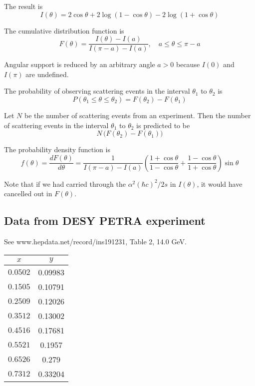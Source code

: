 \documentclass[12pt]{article}
\begin{document}
The result is
\begin{equation*}
I(\theta)=2\cos\theta+2\log(1-\cos\theta)-2\log(1+\cos\theta)
\end{equation*}

The cumulative distribution function is
\begin{equation*}
F(\theta)=\frac{I(\theta)-I(a)}{I(\pi-a)-I(a)},
\quad
a\le\theta\le\pi-a
\end{equation*}

Angular support is reduced by an arbitrary angle $a>0$ because $I(0)$ and $I(\pi)$ are undefined.

\bigskip
The probability of observing scattering events in the interval
$\theta_1$ to $\theta_2$ is
\begin{equation*}
P(\theta_1\le\theta\le\theta_2)=F(\theta_2)-F(\theta_1)
\end{equation*}

Let $N$ be the number of scattering events from an experiment.
Then the number of scattering events in the interval $\theta_1$
to $\theta_2$ is predicted to be
$$
N\,\bigl(F(\theta_2)-F(\theta_1)\bigr)
$$

The probability density function is
$$
f(\theta)=\frac{dF(\theta)}{d\theta}
=\frac{1}{I(\pi-a)-I(a)}
\left(\frac{1+\cos\theta}{1-\cos\theta}+\frac{1-\cos\theta}{1+\cos\theta}\right)
\sin\theta
$$

Note that if we had carried through the $\alpha^2(\hbar c)^2/2s$ in $I(\theta)$,
it would have cancelled out in $F(\theta)$.

\subsection*{Data from DESY PETRA experiment}
See www.hepdata.net/record/ins191231, Table 2, 14.0 GeV.

\begin{center}
\begin{tabular}{|c|c|}
\hline
$x$ & $y$\\
\hline
$0.0502$ & 0.09983\\
$0.1505$ & 0.10791\\
$0.2509$ & 0.12026\\
$0.3512$ & 0.13002\\
$0.4516$ & 0.17681\\
$0.5521$ & 0.1957\phantom{0}\\
$0.6526$ & 0.279\phantom{00}\\
$0.7312$ & 0.33204\\
\hline
\end{tabular}
\end{center}
\end{document}
